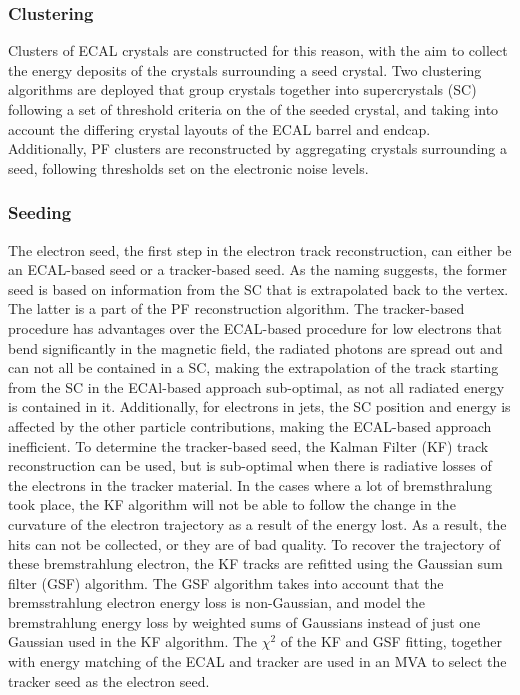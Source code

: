 \subsubsection{Clustering}
Clusters of ECAL crystals are constructed for this reason, with the aim to collect the energy deposits of the crystals surrounding a seed crystal. 
Two clustering algorithms are deployed that group crystals together into supercrystals (SC) following a set of threshold criteria on the \ET of the seeded crystal, and taking into account the differing crystal layouts of the ECAL barrel and endcap.   
Additionally, PF clusters are reconstructed by aggregating crystals surrounding a seed, following thresholds set on the electronic noise levels.  
\subsubsection{Seeding}
The electron seed, the first step in the electron track reconstruction, can either be an ECAL-based seed or a tracker-based seed. 
As the naming suggests, the former seed is based on information from the SC that is extrapolated back to the vertex. 
The latter is a part of the PF reconstruction algorithm. 
The tracker-based procedure has advantages over the ECAL-based procedure for low \pt electrons that bend significantly in the magnetic field, the radiated photons are spread out and can not all be contained in a SC, making the extrapolation of the track starting from the SC in the ECAl-based approach sub-optimal, as not all radiated energy is contained in it. 
Additionally, for electrons in jets, the SC position and energy is affected by the other particle contributions, making the ECAL-based approach inefficient. 
To determine the tracker-based seed, the Kalman Filter (KF) track reconstruction can be used, but is sub-optimal when there is radiative losses of the electrons in the tracker material. 
In the cases where a lot of bremsthralung took place, the KF algorithm will not be able to follow the change in the curvature of the electron trajectory as a result of the energy lost. 
As a result, the hits can not be collected, or they are of bad quality. 
To recover the trajectory of these bremstrahlung electron, the KF tracks are refitted using the Gaussian sum filter (GSF) algorithm.
The GSF algorithm takes into account that the bremsstrahlung electron energy loss is non-Gaussian, and model the bremstrahlung energy loss by weighted sums of Gaussians instead of just one Gaussian used in the KF algorithm. 
The $\chi^{2}$ of the KF and GSF fitting, together with energy matching of the ECAL and tracker are used in an MVA to select the tracker seed as the electron seed. 
